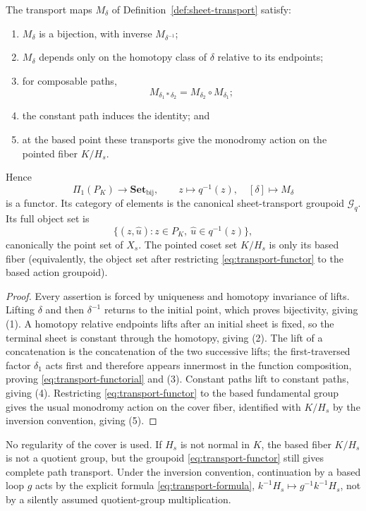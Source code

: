 \begin{proposition}\label{prop:transport}
The transport maps \( M_\delta \) of Definition~\ref{def:sheet-transport} satisfy:
\begin{enumerate}
\item \( M_\delta \) is a bijection, with inverse \( M_{\delta^{-1}} \);
\item \( M_\delta \) depends only on the homotopy class of \( \delta \) relative to its endpoints;
\item for composable paths,
\begin{equation}\label{eq:transport-functorial}
  M_{\delta_1*\delta_2}=M_{\delta_2}\circ M_{\delta_1};
\end{equation}
\item the constant path induces the identity; and
\item at the based point these transports give the monodromy action on the pointed fiber \( K/H_s \).
\end{enumerate}
Hence
\begin{equation}\label{eq:transport-functor}
  \Pi_1(P_K)\longrightarrow\mathbf{Set}_{\mathrm{bij}},
  \qquad
  z\longmapsto q^{-1}(z),\quad
  [\delta]\longmapsto M_\delta
\end{equation}
is a functor.  Its category of elements is the canonical sheet-transport groupoid \( \mathcal G_q \).  Its full object set is
\[
  \bigl\{(z,\widehat u): z\in P_K,\ \widehat u\in q^{-1}(z)\bigr\},
\]
canonically the point set of \( \widehat X_s \).  The pointed coset set \( K/H_s \) is only its based fiber (equivalently, the object set after restricting \eqref{eq:transport-functor} to the based action groupoid).
\end{proposition}

\begin{proof}
Every assertion is forced by uniqueness and homotopy invariance of lifts.  Lifting \( \delta \) and then \( \delta^{-1} \) returns to the initial point, which proves bijectivity, giving (1).  A homotopy relative endpoints lifts after an initial sheet is fixed, so the terminal sheet is constant through the homotopy, giving (2).  The lift of a concatenation is the concatenation of the two successive lifts; the first-traversed factor \( \delta_1 \) acts first and therefore appears innermost in the function composition, proving \eqref{eq:transport-functorial} and (3).  Constant paths lift to constant paths, giving (4).  Restricting \eqref{eq:transport-functor} to the based fundamental group gives the usual monodromy action on the cover fiber, identified with \( K/H_s \) by the inversion convention, giving (5).
\end{proof}

\begin{remark}\label{rem:no-regularity}
No regularity of the cover is used.  If \( H_s \) is not normal in \( K \), the based fiber \( K/H_s \) is not a quotient group, but the groupoid \eqref{eq:transport-functor} still gives complete path transport.  Under the inversion convention, continuation by a based loop \( g \) acts by the explicit formula \eqref{eq:transport-formula}, \( k^{-1}H_s\mapsto g^{-1}k^{-1}H_s \), not by a silently assumed quotient-group multiplication.
\end{remark}